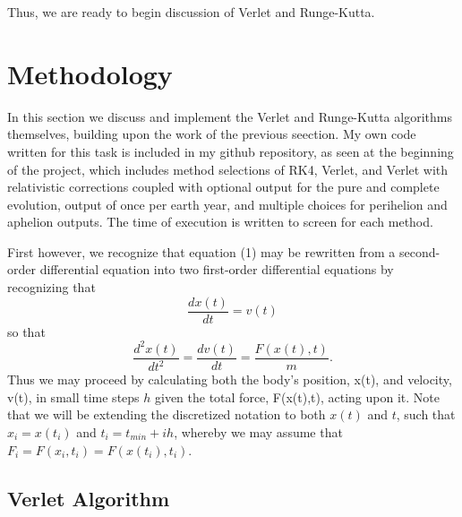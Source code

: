 \documentclass[11pt,a4paper]{article}
\begin{document}
Thus, we are ready to begin discussion of Verlet and Runge-Kutta. 

\section{Methodology}

In this section we discuss and implement the Verlet and Runge-Kutta algorithms themselves, building upon the work of the previous seection. My own code written for this task is included in my github repository, as seen at the beginning of the project, which includes method selections of RK4, Verlet, and Verlet with relativistic corrections coupled with optional output for the pure and complete evolution, output of once per earth year, and multiple choices for perihelion and aphelion outputs. The time of execution is written to screen for each method.

First however, we recognize that equation (1) may be rewritten from a second-order differential equation into two first-order differential equations by recognizing that
\begin{equation}
\frac{dx(t)}{dt} = v(t)
\end{equation}
so that
\begin{equation}
\frac{d^2x(t)}{dt^2} = \frac{dv(t)}{dt} = \frac{F(x(t),t)}{m}.
\end{equation}
Thus we may proceed by calculating both the body's position, x(t), and velocity, v(t), in small time steps $h$ given the total force, F(x(t),t), acting upon it. Note that we will be extending the discretized notation to both $x(t)$ and $t$, such that $x_i = x(t_i)$ and $t_i = t_{min} + ih$, whereby we may assume that $F_i = F(x_i, t_i) = F(x(t_i),t_i)$.


\subsection{Verlet Algorithm}
\end{document}
